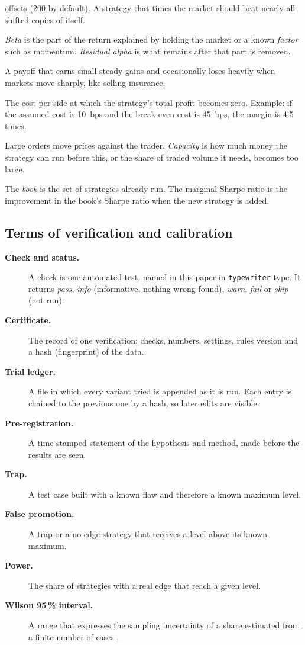 \documentclass[11pt]{article}
\newcommand{\chk}[1]{\texttt{#1}}
\newcommand{\term}[1]{\item[\textbf{#1}]}
\begin{document}
\begin{description}
offsets (200 by default). A strategy that times the market should beat nearly all shifted copies of itself.
\term{Alpha, beta, factor exposure.} \emph{Beta} is the part of the return explained by holding the market or a known
\emph{factor} such as momentum. \emph{Residual alpha} is what remains after that part is removed.
\term{Hidden short volatility.} A payoff that earns small steady gains and occasionally loses heavily when markets move
sharply, like selling insurance.
\term{Break-even cost.} The cost per side at which the strategy's total profit becomes zero. Example: if the assumed cost
is 10~bps and the break-even cost is 45~bps, the margin is 4.5 times.
\term{Market impact and capacity.} Large orders move prices against the trader. \emph{Capacity} is how much money the
strategy can run before this, or the share of traded volume it needs, becomes too large.
\term{Book and marginal Sharpe ratio.} The \emph{book} is the set of strategies already run. The marginal Sharpe ratio is
the improvement in the book's Sharpe ratio when the new strategy is added.
\end{description}

\subsection{Terms of verification and calibration}

\begin{description}
\term{Check and status.} A check is one automated test, named in this paper in \chk{typewriter} type. It returns
\emph{pass}, \emph{info} (informative, nothing wrong found), \emph{warn}, \emph{fail} or \emph{skip} (not run).
\term{Certificate.} The record of one verification: checks, numbers, settings, rules version and a hash (fingerprint)
of the data.
\term{Trial ledger.} A file in which every variant tried is appended as it is run. Each entry is chained to the previous
one by a hash, so later edits are visible.
\term{Pre-registration.} A time-stamped statement of the hypothesis and method, made before the results are seen.
\term{Trap.} A test case built with a known flaw and therefore a known maximum level.
\term{False promotion.} A trap or a no-edge strategy that receives a level above its known maximum.
\term{Power.} The share of strategies with a real edge that reach a given level.
\term{Wilson 95\,\% interval.} A range that expresses the sampling uncertainty of a share estimated from a finite number
of cases \citep{wilson1927}.
\end{description}
\end{document}
